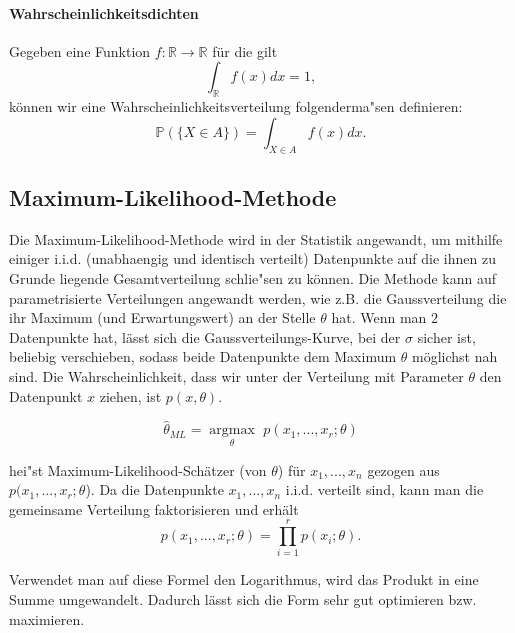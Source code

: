 \paragraph{Wahrscheinlichkeitsdichten}

Gegeben eine Funktion $f: \mathbb{R} \rightarrow \mathbb{R}$ f\"ur die gilt 
\begin{equation*}
\int_{\mathbb{R}} f(x) dx = 1,
\end{equation*}
k\"onnen wir eine Wahrscheinlichkeitsverteilung folgenderma"sen definieren:
\begin{equation*}
\mathbb{P} (\{X\in A\}) = \int_{X \in A} f(x) dx. 
\end{equation*}


\subsection{Maximum-Likelihood-Methode}

Die Maximum-Likelihood-Methode wird in der Statistik angewandt, um mithilfe einiger i.i.d. (unabhaengig und identisch verteilt) Datenpunkte auf die ihnen zu Grunde liegende Gesamtverteilung schlie"sen zu k\"onnen. Die Methode kann auf parametrisierte Verteilungen angewandt werden, wie z.B. die Gaussverteilung die ihr Maximum (und Erwartungswert) an der Stelle $\theta$ hat. Wenn man $2$ Datenpunkte hat, l\"asst sich die Gaussverteilungs-Kurve, bei der $\sigma$ sicher ist, beliebig verschieben, sodass beide Datenpunkte dem Maximum $\theta$ m\"oglichst nah sind.
Die Wahrscheinlichkeit, dass wir unter der Verteilung mit Parameter $\theta$ den Datenpunkt $x$ ziehen, ist $p(x,\theta)$. 

\begin{equation*}
\hat{\theta}_{ML} = \underset{\theta}{\operatorname{argmax}} \,\, p (x_{1},...,x_{r};\theta)
\end{equation*}

\noindent hei"st Maximum-Likelihood-Sch\"atzer (von $\theta$) für $x_{1},...,x_{n}$ gezogen aus $p(x_{1},...,x_{r};\theta$). Da die Datenpunkte $x_1, \dots, x_n$ i.i.d. verteilt sind, kann man die gemeinsame Verteilung faktorisieren und erh\"alt
\begin{equation*}
p (x_{1},...,x_{r};\theta) = \prod_{i=1}^r p(x_i;\theta).
\end{equation*}

Verwendet man auf diese Formel den Logarithmus, wird das Produkt in eine Summe umgewandelt. Dadurch l\"asst sich die Form sehr gut optimieren bzw. maximieren. 


